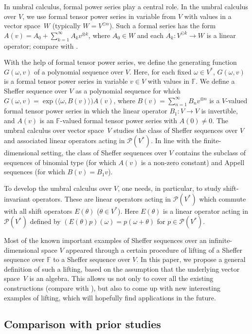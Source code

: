 \documentclass[12pt]{article}
\theoremstyle{remark}
\theoremstyle{remark}
\theoremstyle{remark}
\begin{document}
In umbral calculus, formal power series play a central role.  In the umbral calculus over $V$, we use formal tensor power series in variable from $V$ with values in a vector space~$W$ (typically $W=V^{\odot n}$).  Such a formal series has the form $A(v)=A_0+\sum_{k=1}^\infty A_kv^{\otimes k}$, where $A_0\in W$ and each $A_k:V^{\odot k}\to W$ is a linear operator; compare with \cite{FKLO}.

With the help of  formal tensor power series, we define the generating function $G(\omega,v)$ of a polynomial sequence over $V$. Here, for each fixed $\omega\in V^*$, $G(\omega,v)$ is a formal tensor power series in variable $v\in V$ with values in $\mathbb F$. 
We define a Sheffer sequence over $V$ as a polynomial sequence for which $G(\omega,v)=\exp\big(\langle \omega, B(v)\rangle)A(v)$, where $B(v)=\sum_{n=1}^\infty B_nv^{\otimes n}$ is a $V$-valued formal tensor power series in which the linear operator $B_1:V\to V$ is invertible, and $A(v)$ is an $\mathbb F$-valued formal tensor power series with $A(0)\ne0$. 
The umbral calculus over vector space~$V$ studies the class of Sheffer sequences over $V$ and 
associated linear operators acting in $\mathcal P(V^*)$. In line with the finite-dimensional setting, the class of Sheffer sequences over $V$ contains the subclass of sequences of binomial type (for which $A(v)$ is a non-zero constant) and Appell sequences (for which $B(v)=B_1v$).  

To develop the umbral calculus over $V$, one needs, in particular,  to study shift-invariant operators. These are linear operators acting in $\mathcal P(V^*)$ which commute with all shift operators  $E(\theta)$ ($\theta\in V^*$). Here $E(\theta)$ is a linear operator acting in $\mathcal P(V^*)$ defined by $(E(\theta)p)(\omega)=p(\omega+\theta)$ for $p\in\mathcal P(V^*)$.

Most of the known important examples of Sheffer sequences over an infinite-dim\-ens\-ional space $V$ appeared through a certain procedure of lifting of a Sheffer sequence over $\mathbb F$ to a Sheffer sequence over $V$. In this paper, we propose a general definition of such a lifting, based on the assumption that the underlying vector space~$V$ is an algebra. 
This allows us not only to cover all the existing constructions (compare with \cite[Sections~5 and~7]{FKLO}), but also to come up with new interesting examples of lifting, which will hopefully find applications in the future.


\subsection{Comparison with prior studies}
  
\end{document}
